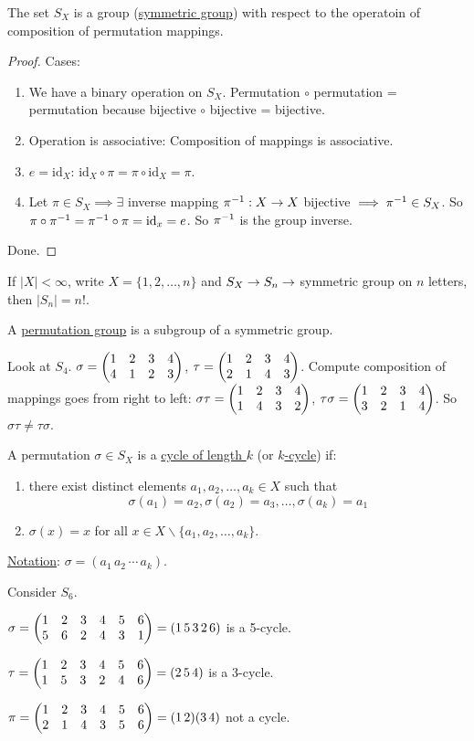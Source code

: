 \documentclass[]{article}
\begin{document}
\begin{theorem}
	The set $S_X$ is a group (\ul{symmetric group}) with respect to the operatoin of composition of permutation mappings.
\end{theorem}
\begin{proof}
	Cases:
	\begin{enumerate}
		\item We have a binary operation on $S_X$. Permutation $\circ$ permutation = permutation because bijective $\circ$ bijective = bijective.
		\item Operation is associative: Composition of mappings is associative.
		\item $e = \text{id}_X$: $\text{id}_X \circ \pi = \pi\circ \text{id}_X = \pi$.
		\item Let $\pi\in S_X \implies \exists$ inverse mapping $\pi^{-1}: X\rightarrow X$ bijective $\implies \pi^{-1}\in S_X$. So $\pi\circ\pi^{-1} = \pi^{-1}\circ\pi = \text{id}_x = e$. So $\pi^{-1}$ is the group inverse.
	\end{enumerate}
	Done.
\end{proof}

If $|X|<\infty$, write $X = \{1,2,\dots,n\}$ and $S_X\rightarrow S_n \rightarrow$ symmetric group on $n$ letters, then $|S_n| = n!$.

\begin{definition}
	A \ul{permutation group} is a subgroup of a symmetric group.
\end{definition}
\begin{example}
	Look at $S_4$. $\sigma = \begin{pmatrix}1&2&3&4\\4&1&2&3\end{pmatrix}$, $\tau = \begin{pmatrix}1&2&3&4 \\ 2&1&4&3\end{pmatrix}$. Compute composition of mappings goes from right to left: $\sigma \tau  = \begin{pmatrix}1&2&3&4\\1&4&3&2\end{pmatrix}$, $\tau\sigma = \begin{pmatrix}1&2&3&4\\3&2&1&4\end{pmatrix}$. So $\sigma\tau \neq \tau\sigma$.
\end{example}

\begin{definition}
	A permutation $\sigma\in S_X$ is a \ul{cycle of length $k$} (or \ul{$k$-cycle}) if:
	\begin{enumerate}
		\item there exist distinct elements $a_1,a_2,\dots,a_k\in X$ such that 
			$$\sigma(a_1) = a_2, \sigma(a_2) = a_3,\dots,\sigma(a_k) = a_1$$
		\item $\sigma(x) = x$ for all $x\in X\backslash\{a_1,a_2,\dots,a_k\}$.
	\end{enumerate}
	\ul{Notation}: $\sigma = (a_1\,a_2\,\cdots\,a_k)$.
\end{definition}
\begin{example}
	Consider $S_6$.

	$\sigma = \begin{pmatrix}1&2&3&4&5&6\\5&6&2&4&3&1\end{pmatrix} = (1\,5\,3\,2\,6)$ is a 5-cycle. 
	
	$\tau = \begin{pmatrix}1&2&3&4&5&6\\1&5&3&2&4&6\end{pmatrix} = (2\,5\,4)$ is a 3-cycle.

	$\pi = \begin{pmatrix}1&2&3&4&5&6\\2&1&4&3&5&6\end{pmatrix} = (1\,2)(3\,4)$ not a cycle.
\end{example}
\end{document}
